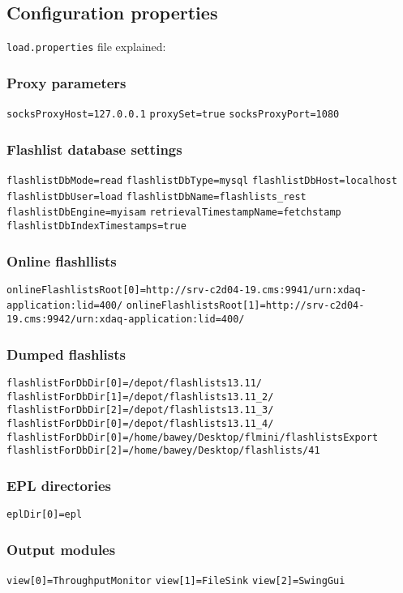 \subsection{Configuration properties}

\texttt{load.properties} file explained:

\subsubsection{Proxy parameters}
\texttt{socksProxyHost=127.0.0.1}
\texttt{proxySet=true}
\texttt{socksProxyPort=1080}
\subsubsection{Flashlist database settings}
\texttt{flashlistDbMode=read}
\texttt{flashlistDbType=mysql}
\texttt{flashlistDbHost=localhost}
\texttt{flashlistDbUser=load}
\texttt{flashlistDbName=flashlists\_rest}
\texttt{flashlistDbEngine=myisam}
\texttt{retrievalTimestampName=fetchstamp}
\texttt{flashlistDbIndexTimestamps=true}

\subsubsection{Online flashllists}

\texttt{onlineFlashlistsRoot[0]=http://srv-c2d04-19.cms:9941/urn:xdaq-application:lid=400/}
\texttt{onlineFlashlistsRoot[1]=http://srv-c2d04-19.cms:9942/urn:xdaq-application:lid=400/}

\subsubsection{Dumped flashlists}
\texttt{flashlistForDbDir[0]=/depot/flashlists13.11/}
\texttt{flashlistForDbDir[1]=/depot/flashlists13.11\_2/}
\texttt{flashlistForDbDir[2]=/depot/flashlists13.11\_3/}
\texttt{flashlistForDbDir[0]=/depot/flashlists13.11\_4/}
\texttt{flashlistForDbDir[0]=/home/bawey/Desktop/flmini/flashlistsExport}
\texttt{flashlistForDbDir[2]=/home/bawey/Desktop/flashlists/41}


\subsubsection{EPL directories}
\texttt{eplDir[0]=epl}


\subsubsection{Output modules}
\texttt{view[0]=ThroughputMonitor}
\texttt{view[1]=FileSink}
\texttt{view[2]=SwingGui}


